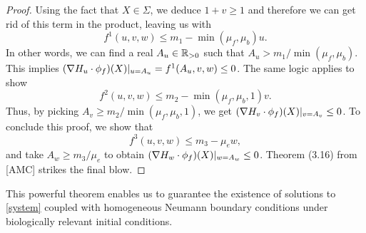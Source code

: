 \begin{proof}
	Using the fact that $X \in \Sigma$, we deduce $1 + v \ge 1$ and therefore we can get rid of this term in the product, leaving us with 
	$$f^1(u, v, w) \le m_1 - \min(\mu_f, \mu_b) u.$$
	In other words, we can find a real $A_u \in \mathbb{R}_{>0}$ such that $A_u > m_1 / \min(\mu_f, \mu_b)$. This implies $(\nabla H_u \cdot \phi_f)(X)\vert_{u=A_u} = f^1(A_u, v, w) \le 0$. The same logic applies to show $$f^2(u, v, w) \le m_2 - \min(\mu_f, \mu_b, 1) v.$$ Thus, by picking $A_v \ge m_2 / \min(\mu_f, \mu_b, 1)$, we get $(\nabla H_v \cdot \phi_f)(X)\vert_{v=A_v} \le 0$. To conclude this proof, we show that $$f^3(u, v, w) \le m_3 - \mu_e w,$$ and take $A_w \ge m_3 / \mu_e$ to obtain $(\nabla H_w \cdot \phi_f)(X)\vert_{w=A_w} \le 0$. Theorem (3.16) from [AMC] strikes the final blow.	
\end{proof}

This powerful theorem enables us to guarantee the existence of solutions to \ref{system} coupled with homogeneous Neumann boundary conditions under biologically relevant initial conditions. 



